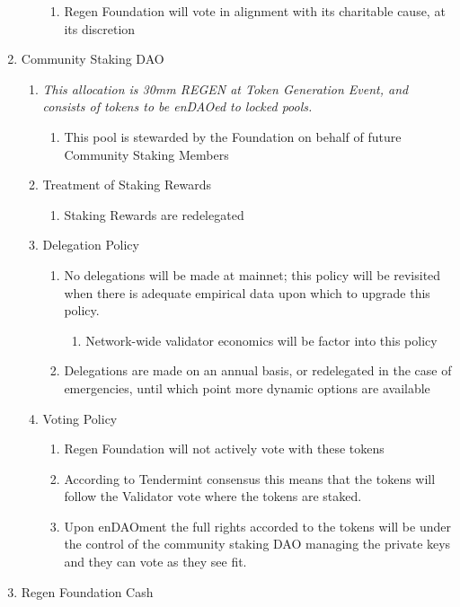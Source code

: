 \documentclass{article}
\begin{document}
\begin{enumerate}
\begin{enumerate}
\begin{enumerate}
\item Regen Foundation will vote in alignment with its charitable cause, at its discretion
\end{enumerate}
\end{enumerate}
\item Community Staking DAO
\begin{enumerate}
\item {\it This allocation is 30mm REGEN at Token Generation Event, and consists of tokens to be enDAOed to locked pools.}
\begin{enumerate}
\item This pool is stewarded by the Foundation on behalf of future Community Staking Members
\end{enumerate}
\item Treatment of Staking Rewards
\begin{enumerate}
\item Staking Rewards are redelegated
\end{enumerate}
\item Delegation Policy
\begin{enumerate}
\item No delegations will be made at mainnet; this policy will be revisited when there is adequate empirical data upon which to upgrade this policy.
\begin{enumerate}
\item Network-wide validator economics will be factor into this policy
\end{enumerate}
\item Delegations are made on an annual basis, or redelegated in the case of emergencies, until which point more dynamic options are available
\end{enumerate}
\item Voting Policy
\begin{enumerate}
\item Regen Foundation will not actively vote with these tokens
\item According to Tendermint consensus this means that the tokens will follow the Validator vote where the tokens are staked.  
\item Upon enDAOment the full rights accorded to the tokens will be under the control of the community staking DAO managing the private keys and they can vote as they see fit.
\end{enumerate}
\end{enumerate}
\item Regen Foundation Cash

\end{enumerate}
\end{document}
